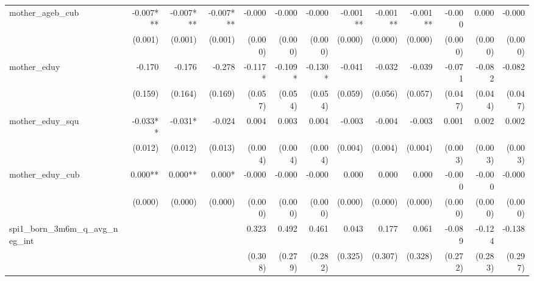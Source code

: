 \begin{tabular}{lrrrrrrrrrrrr}
mother\_ageb\_cub                           &    -0.007*** &    -0.007*** &    -0.007*** &       -0.000 &       -0.000 &       -0.000 &     -0.001** &     -0.001** &     -0.001** &       -0.000 &        0.000 &       -0.000 \\ 
                                            &      (0.001) &      (0.001) &      (0.001) &      (0.000) &      (0.000) &      (0.000) &      (0.000) &      (0.000) &      (0.000) &      (0.000) &      (0.000) &      (0.000) \\ 
mother\_eduy                                &       -0.170 &       -0.176 &       -0.278 &      -0.117* &      -0.109* &      -0.130* &       -0.041 &       -0.032 &       -0.039 &       -0.071 &       -0.082 &       -0.082 \\ 
                                            &      (0.159) &      (0.164) &      (0.169) &      (0.057) &      (0.054) &      (0.054) &      (0.059) &      (0.056) &      (0.057) &      (0.047) &      (0.044) &      (0.047) \\ 
mother\_eduy\_squ                           &     -0.033** &      -0.031* &       -0.024 &        0.004 &        0.003 &        0.004 &       -0.003 &       -0.004 &       -0.003 &        0.001 &        0.002 &        0.002 \\ 
                                            &      (0.012) &      (0.012) &      (0.013) &      (0.004) &      (0.004) &      (0.004) &      (0.004) &      (0.004) &      (0.004) &      (0.003) &      (0.003) &      (0.003) \\ 
mother\_eduy\_cub                           &      0.000** &      0.000** &       0.000* &       -0.000 &       -0.000 &       -0.000 &        0.000 &        0.000 &        0.000 &       -0.000 &       -0.000 &       -0.000 \\ 
                                            &      (0.000) &      (0.000) &      (0.000) &      (0.000) &      (0.000) &      (0.000) &      (0.000) &      (0.000) &      (0.000) &      (0.000) &      (0.000) &      (0.000) \\ 
spi1\_born\_3m6m\_q\_avg\_neg\_int          &              &              &              &        0.323 &        0.492 &        0.461 &        0.043 &        0.177 &        0.061 &       -0.089 &       -0.124 &       -0.138 \\ 
                                            &              &              &              &      (0.308) &      (0.279) &      (0.282) &      (0.325) &      (0.307) &      (0.328) &      (0.272) &      (0.283) &      (0.297) \\ 

\end{tabular}
